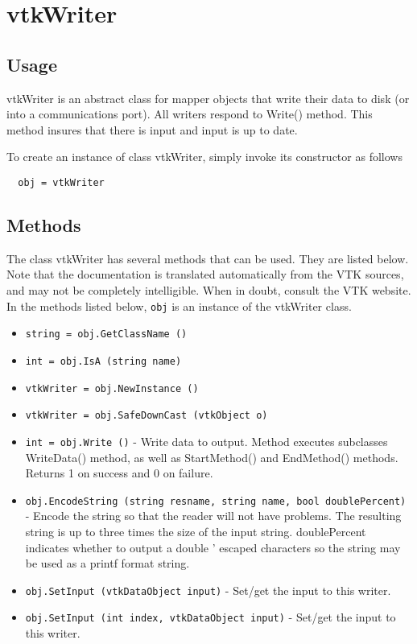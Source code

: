 \section{vtkWriter}

\subsection{Usage}

 vtkWriter is an abstract class for mapper objects that write their data
 to disk (or into a communications port). All writers respond to Write()
 method. This method insures that there is input and input is up to date.

To create an instance of class vtkWriter, simply
invoke its constructor as follows
\begin{verbatim}
  obj = vtkWriter
\end{verbatim}
\subsection{Methods}

The class vtkWriter has several methods that can be used.
  They are listed below.
Note that the documentation is translated automatically from the VTK sources,
and may not be completely intelligible.  When in doubt, consult the VTK website.
In the methods listed below, \verb|obj| is an instance of the vtkWriter class.
\begin{itemize}
\item  \verb|string = obj.GetClassName ()|

\item  \verb|int = obj.IsA (string name)|

\item  \verb|vtkWriter = obj.NewInstance ()|

\item  \verb|vtkWriter = obj.SafeDownCast (vtkObject o)|

\item  \verb|int = obj.Write ()| -  Write data to output. Method executes subclasses WriteData() method, as 
 well as StartMethod() and EndMethod() methods.
 Returns 1 on success and 0 on failure.

\item  \verb|obj.EncodeString (string resname, string name, bool doublePercent)| -  Encode the string so that the reader will not have problems.
 The resulting string is up to three times the size of the input 
 string.  doublePercent indicates whether to output a double '%
 escaped characters so the string may be used as a printf format string.

\item  \verb|obj.SetInput (vtkDataObject input)| -  Set/get the input to this writer.

\item  \verb|obj.SetInput (int index, vtkDataObject input)| -  Set/get the input to this writer.

\end{itemize}
